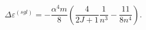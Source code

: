 \begin{equation}
\Delta \varepsilon ^{(sgl)}=-\frac{\alpha ^{4}m}{8}\left( \frac{4}{2J+1}%
\frac{1}{n^{3}}-\frac{11}{8n^{4}}\right) .
\end{equation}

